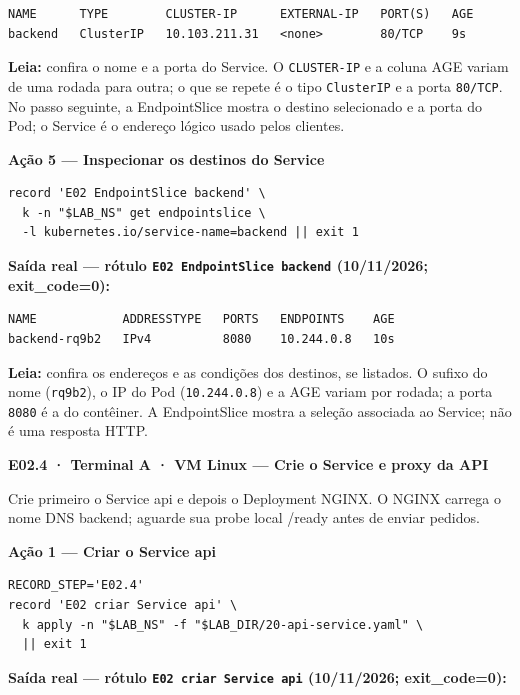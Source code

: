 \documentclass[12pt,openany,oneside,a4paper,chapter=TITLE,english,brazil]{abntex2}
\begin{document}
\begin{verbatim}
NAME      TYPE        CLUSTER-IP      EXTERNAL-IP   PORT(S)   AGE
backend   ClusterIP   10.103.211.31   <none>        80/TCP    9s
\end{verbatim}

\textbf{Leia:} confira o nome e a porta do Service. O \texttt{CLUSTER-{}\allowbreak{}IP} e a coluna AGE variam de uma rodada para outra; o que se repete é o tipo \texttt{Cluster\allowbreak{}IP} e a porta \texttt{80/\allowbreak{}TCP}. No passo seguinte, a EndpointSlice mostra o destino selecionado e a porta do Pod; o Service é o endereço lógico usado pelos clientes.

\textbf{Ação 5 --- Inspecionar os destinos do Service}

\begin{verbatim}
record 'E02 EndpointSlice backend' \
  k -n "$LAB_NS" get endpointslice \
  -l kubernetes.io/service-name=backend || exit 1
\end{verbatim}

\textbf{Saída real --- rótulo \texttt{E02 Endpoint\allowbreak{}Slice backend} (10/11/2026; exit\_code=0):}

\begin{verbatim}
NAME            ADDRESSTYPE   PORTS   ENDPOINTS    AGE
backend-rq9b2   IPv4          8080    10.244.0.8   10s
\end{verbatim}

\textbf{Leia:} confira os endereços e as condições dos destinos, se listados. O sufixo do nome (\texttt{rq9b2}), o IP do Pod (\texttt{10.\allowbreak{}244.\allowbreak{}0.\allowbreak{}8}) e a AGE variam por rodada; a porta \texttt{8080} é a do contêiner. A EndpointSlice mostra a seleção associada ao Service; não é uma resposta HTTP.

\clearpage

\textbf{E02.4 · Terminal A · VM Linux --- Crie o Service e proxy da API}

Crie primeiro o Service api e depois o Deployment NGINX. O NGINX carrega o nome DNS backend; aguarde sua probe local /ready antes de enviar pedidos.

\textbf{Ação 1 --- Criar o Service api}

\begin{verbatim}
RECORD_STEP='E02.4'
record 'E02 criar Service api' \
  k apply -n "$LAB_NS" -f "$LAB_DIR/20-api-service.yaml" \
  || exit 1
\end{verbatim}

\textbf{Saída real --- rótulo \texttt{E02 criar Service api} (10/11/2026; exit\_code=0):}
\end{document}
